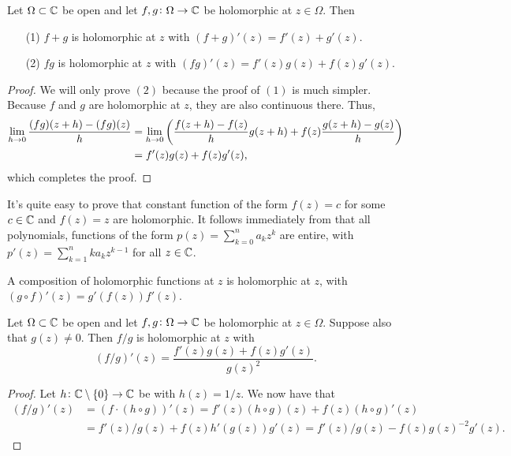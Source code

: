 \documentclass[11pt,a4paper]{article}
\begin{document}
\begin{proposition}
  \label{prop:holo-is-linear}
  Let $\Omega \subset \mathbb{C}$ be open and let $f,g \colon \Omega \to \mathbb{C}$ be
  holomorphic at $z \in \Omega$. Then
  \begin{enumerate}
    \item[(1)] $f + g$ is holomorphic at $z$ with $(f + g)'(z) = f'(z) + g'(z)$.
    \item[(2)] $f g$ is holomorphic at $z$ with $(f g)'(z) = 
      f'(z)g(z) + f(z)g'(z)$.
  \end{enumerate}
\end{proposition}

\begin{proof}
  We will only prove $(2)$ because the proof of $(1)$ is much simpler.
  Because $f$ and $g$ are holomorphic at $z$, they are also continuous
  there. Thus,
  \begin{align*}
    \lim_{h \to 0} \frac{(f g)(z + h) - (f g)(z)}{h} &=
    \lim_{h \to 0} \del{\frac{f(z + h) - f(z)}{h} g(z + h) + 
  f(z) \frac{g(z + h) - g(z)}{h}} \\ &=
    f'(z)g(z) + f(z)g'(z),
  \end{align*}
  which completes the proof.
\end{proof}

\begin{corollary}
  It's quite easy to prove that constant function of the form $f(z) = c$
  for some $c \in \mathbb{C}$ and $f(z) = z$ are holomorphic.
  It follows immediately from  that all polynomials,
  functions of the form $p(z) = \sum_{k=0}^{n} a_k z^k$ are entire, with
  $p'(z) = \sum_{k=1}^{n} k a_k z^{k-1}$ for all $z \in \mathbb{C}$.
\end{corollary}

\begin{proposition}
  A composition of holomorphic functions at $z$ is holomorphic at $z$, with
  $(g \circ f)'(z) = g'(f(z)) f'(z)$.
\end{proposition}

\begin{corollary}
  Let $\Omega \subset \mathbb{C}$ be open and let $f,g \colon \Omega \to \mathbb{C}$ be
  holomorphic at $z \in \Omega$.
  Suppose also that $g(z) \neq 0$.
  Then $f/g$ is holomorphic at $z$ with
  \[
    (f/g)'(z) = \frac{f'(z)g(z) + f(z)g'(z)}{g(z)^2}.
  \]
\end{corollary}
\begin{proof}
  Let $h \colon \mathbb{C} \setminus \set{0} \to \mathbb{C}$ be with $h(z) = 1/z$.
  We now have that
  \begin{align*}
    (f/g)'(z) &=
    (f \cdot (h \circ g))'(z) =
    f'(z)(h \circ g)(z) + f(z)(h \circ g)'(z) \\ &=
    f'(z)/g(z) + f(z)h'(g(z))g'(z) =
    f'(z)/g(z) - f(z)g(z)^{-2}g'(z).
  \end{align*}
\end{proof}
\end{document}

